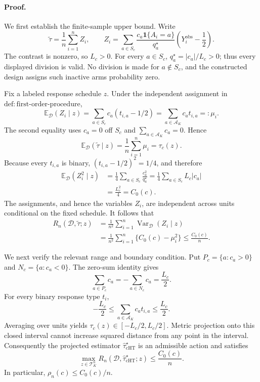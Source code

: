 \paragraph{Proof.}
We first establish the finite-sample upper bound.  Write
\[
 \widetilde\tau=\frac1n\sum_{i=1}^n Z_i,
 \qquad
 Z_i=\sum_{a\in S_c}
 \frac{c_a\mathbf 1\{A_i=a\}}{q_a^\star}
 \left(Y_i^{\mathrm{obs}}-\frac12\right).
\]
The contrast is nonzero, so \(L_c>0\).  For every \(a\in S_c\),
\(q_a^\star=|c_a|/L_c>0\); thus every displayed division is valid.  No
division is made for \(a\notin S_c\), and the constructed design assigns
such inactive arms probability zero.

Fix a labeled response schedule \(z\).  Under the independent assignment
in \(\mathrm{def:first\text{-}order\text{-}procedure}\),
\[
 \mathbb E_{\mathcal D}(Z_i\mid z)
 =\sum_{a\in S_c}c_a(t_{i,a}-1/2)
 =\sum_{a\in\mathcal A_K}c_at_{i,a}
 =:\mu_i.
\]
The second equality uses \(c_a=0\) off \(S_c\) and
\(\sum_{a\in\mathcal A_K}c_a=0\).  Hence
\[
 \mathbb E_{\mathcal D}(\widetilde\tau\mid z)
 =\frac1n\sum_{i=1}^n\mu_i=\tau_c(z).
\]
Because every \(t_{i,a}\) is binary,
\((t_{i,a}-1/2)^2=1/4\), and therefore
\[
 \begin{aligned}
 \mathbb E_{\mathcal D}(Z_i^2\mid z)
 &=\frac14\sum_{a\in S_c}\frac{c_a^2}{q_a^\star}
 =\frac14\sum_{a\in S_c}L_c|c_a|\\
 &=\frac{L_c^2}{4}=C_0(c).
 \end{aligned}
\]
The assignments, and hence the variables \(Z_i\), are independent across
units conditional on the fixed schedule.  It follows that
\[
 \begin{aligned}
 R_n(\mathcal D,\widetilde\tau;z)
 &=\frac1{n^2}\sum_{i=1}^n
   \operatorname{Var}_{\mathcal D}(Z_i\mid z)\\
 &=\frac1{n^2}\sum_{i=1}^n\{C_0(c)-\mu_i^2\}
 \le \frac{C_0(c)}n.
 \end{aligned}
\]

We next verify the relevant range and boundary condition.  Put
\(P_c=\{a:c_a>0\}\) and \(N_c=\{a:c_a<0\}\).  The zero-sum identity gives
\[
 \sum_{a\in P_c}c_a=-\sum_{a\in N_c}c_a=\frac{L_c}{2}.
\]
For every binary response type \(t_i\),
\[
 -\frac{L_c}{2}
 \le \sum_{a\in\mathcal A_K}c_at_{i,a}
 \le \frac{L_c}{2}.
\]
Averaging over units yields
\(\tau_c(z)\in[-L_c/2,L_c/2]\).  Metric projection onto this closed
interval cannot increase squared distance from any point in the interval.
Consequently the projected estimator \(\widehat\tau_{\mathrm{cHT}}^\star\)
is an admissible action and satisfies
\[
 \max_{z\in\mathcal T_K^n}
 R_n(\mathcal D,\widehat\tau_{\mathrm{cHT}}^\star;z)
 \le \frac{C_0(c)}n.
\]
In particular, \(\rho_n(c)\le C_0(c)/n\).

